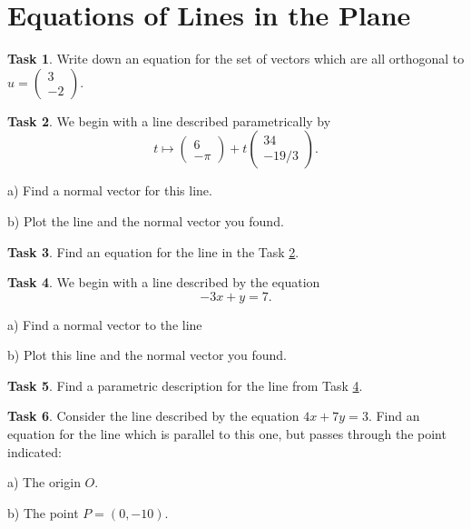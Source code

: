 \documentclass{tufte-book}
\theoremstyle{definition}
\newtheorem{task}{Task}
\begin{document}
\section*{Equations of Lines in the Plane}

\begin{task}
Write down an equation for the set of vectors which are all orthogonal to $u=\left(\begin{smallmatrix} 3 \\ -2\end{smallmatrix}\right)$.
\end{task}

\begin{task}\label{task:norm-to-param}
We begin with a line described parametrically by
\[
t \mapsto \begin{pmatrix} 6\\ -\pi \end{pmatrix} + t \begin{pmatrix} 34 \\ -19/3\end{pmatrix}.
\]
\begin{compactitem}
\item[a)] Find a normal vector for this line.
\item[b)] Plot the line and the normal vector you found.
\end{compactitem}
\end{task}

\begin{task}
Find an equation for the line in the Task \ref{task:norm-to-param}.
\end{task}

\clearpage

\begin{task}\label{task:norm-to-eqn}
We begin with a line described by the equation
\[
-3x + y =7.
\]
\begin{compactitem}
\item[a)] Find a normal vector to the line
\item[b)] Plot this line and the normal vector you found.
\end{compactitem}
\end{task}

\begin{task}
Find a parametric description for the line from Task \ref{task:norm-to-eqn}.
\end{task}

\begin{task}
Consider the line described by the equation $4x+7y=3$. Find an equation for the line which is parallel to this one, but passes through the point indicated:
\begin{compactitem}
\item[a)] The origin $O$.
\item[b)] The point $P = (0,-10)$.
\end{compactitem}
\end{task}
\end{document}
